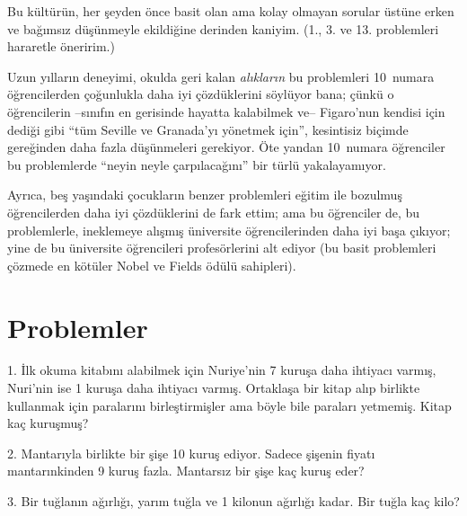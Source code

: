 Bu kültürün, her şeyden önce basit olan ama kolay olmayan sorular üstüne  erken ve  bağımsız düşünmeyle  ekildiğine derinden kaniyim. (1., 3. ve 13. problemleri hararetle öneririm.)

Uzun yılların deneyimi, okulda geri kalan {\em alıkların} bu problemleri 10~numara öğrencilerden çoğunlukla daha iyi çözdüklerini söylüyor bana; 
çünkü o öğrencilerin  --sınıfın en gerisinde hayatta kalabilmek ve--
Figaro'nun kendisi için dediği gibi  \enquote{tüm  Seville ve  Granada'yı yönetmek için},
kesintisiz biçimde gereğinden daha fazla düşünmeleri gerekiyor. Öte yandan 10~numara öğrenciler  bu problemlerde \enquote{neyin neyle çarpılacağını} bir türlü yakalayamıyor. 

Ayrıca, beş yaşındaki çocukların benzer problemleri eğitim ile bo\-zul\-muş öğrencilerden daha iyi 
çözdüklerini de fark ettim; ama bu öğrenciler de, bu problemlerle, ineklemeye alışmış üniversite öğ\-ren\-ci\-le\-rin\-den daha iyi başa çıkıyor; yine de bu üniversite öğrencileri pro\-fe\-sör\-le\-ri\-ni alt ediyor (bu basit problemleri çözmede en kötüler Nobel ve Fields ödülü sahipleri).

\clearpage
\section*{Problemler}





 
\begin{problem}{1.}
	İlk okuma kitabını alabilmek için Nuriye'nin 7 kuruşa daha ihtiyacı varmış, Nuri'nin  ise 1 kuruşa daha ihtiyacı varmış. Ortaklaşa bir kitap alıp birlikte kullanmak için paralarını birleştirmişler ama böyle bile paraları yetmemiş. Kitap kaç kuruşmuş?
\end{problem}

\begin{problem}{2.}
	Mantarıyla birlikte bir şişe 10 kuruş ediyor. Sadece şişenin fiyatı mantarınkinden 9 kuruş fazla. Mantarsız bir şişe kaç kuruş eder?
\end{problem}


\begin{problem}{3.}
Bir tuğlanın ağırlığı, yarım tuğla ve 1 kilonun ağırlığı kadar. Bir tuğla kaç kilo?
\end{problem}

